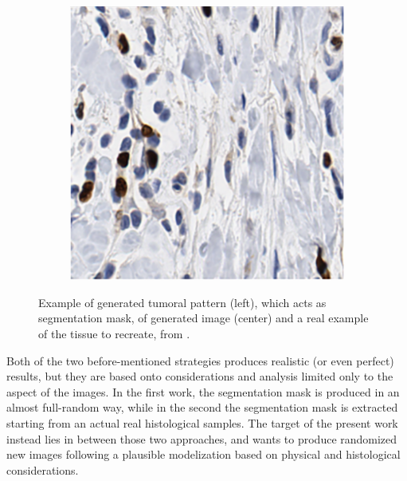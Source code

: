 \begin{figure}[t]
\begin{subfigure}[t]{0.3\textwidth}
             \caption{}
             \label{fig:cgan_model}
        \end{subfigure}
        \quad
        \begin{subfigure}[t]{0.3\textwidth}
             \centering
             \includegraphics[width = \textwidth]{images/cgan_real}
             \caption{}
             \label{fig:cgan_real}
        \end{subfigure}
        \caption{Example of generated tumoral pattern (left), which acts as segmentation mask, of generated image (center) and a real example of the tissue to recreate, from \cite{Senaras2018}.}
        \label{fig:cgan_tripl}
    \end{figure}


Both of the two before-mentioned strategies produces realistic (or even perfect) results, but they are based onto considerations and analysis limited only to the aspect of the images. In the first work, the segmentation mask is produced in an almost full-random way, while in the second the segmentation mask is extracted starting from an actual real histological samples. The target of the present work instead lies in between those two approaches, and wants to produce randomized new images following a plausible modelization based on physical and histological considerations.

